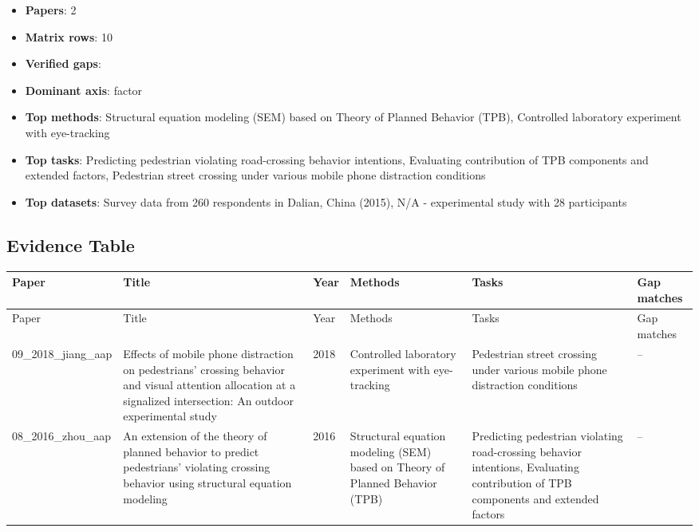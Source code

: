 \documentclass{article}
\begin{document}
\begin{itemize}
\item \textbf{Papers}: 2
\item \textbf{Matrix rows}: 10
\item \textbf{Verified gaps}: 
\item \textbf{Dominant axis}: factor
\item \textbf{Top methods}: Structural equation modeling (SEM) based on Theory of Planned Behavior (TPB), Controlled laboratory experiment with eye-tracking
\item \textbf{Top tasks}: Predicting pedestrian violating road-crossing behavior intentions, Evaluating contribution of TPB components and extended factors, Pedestrian street crossing under various mobile phone distraction conditions
\item \textbf{Top datasets}: Survey data from 260 respondents in Dalian, China (2015), N/A - experimental study with 28 participants
\end{itemize}

\subsection{Evidence Table}
\begin{longtable}{p{}p{}p{}p{}p{}p{}}
\toprule
Paper & Title & Year & Methods & Tasks & Gap matches \\
\midrule
\endfirsthead
\toprule
Paper & Title & Year & Methods & Tasks & Gap matches \\
\midrule
\endhead
09\_2018\_jiang\_aap & Effects of mobile phone distraction on pedestrians' crossing behavior and visual attention allocation at a signalized intersection: An outdoor experimental study & 2018 & Controlled laboratory experiment with eye-tracking & Pedestrian street crossing under various mobile phone distraction conditions & -- \\
08\_2016\_zhou\_aap & An extension of the theory of planned behavior to predict pedestrians' violating crossing behavior using structural equation modeling & 2016 & Structural equation modeling (SEM) based on Theory of Planned Behavior (TPB) & Predicting pedestrian violating road-crossing behavior intentions, Evaluating contribution of TPB components and extended factors & -- \\
\bottomrule
\end{longtable}
\end{document}
